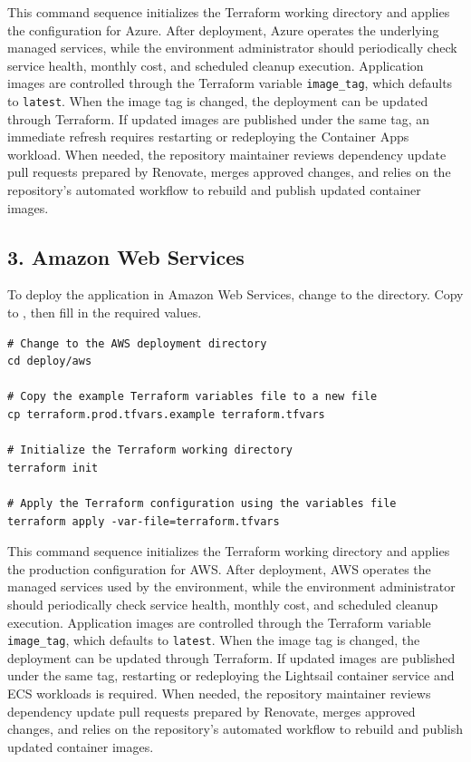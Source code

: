 This command sequence initializes the Terraform working directory and applies the configuration for Azure.
After deployment, Azure operates the underlying managed services, while the environment administrator should periodically check service health, monthly cost, and scheduled cleanup execution.
Application images are controlled through the Terraform variable \texttt{image\_tag}, which defaults to \texttt{latest}.
When the image tag is changed, the deployment can be updated through Terraform.
If updated images are published under the same tag, an immediate refresh requires restarting or redeploying the Container Apps workload.
When needed, the repository maintainer reviews dependency update pull requests prepared by Renovate, merges approved changes, and relies on the repository's automated workflow to rebuild and publish updated container images.

\subsection*{3. Amazon Web Services}
To deploy the application in Amazon Web Services, change to the  directory.
Copy  to , then fill in the required values.

\begin{verbatim}
# Change to the AWS deployment directory
cd deploy/aws

# Copy the example Terraform variables file to a new file
cp terraform.prod.tfvars.example terraform.tfvars

# Initialize the Terraform working directory
terraform init

# Apply the Terraform configuration using the variables file
terraform apply -var-file=terraform.tfvars
\end{verbatim}

This command sequence initializes the Terraform working directory and applies the production configuration for AWS\@.
After deployment, AWS operates the managed services used by the environment, while the environment administrator should periodically check service health, monthly cost, and scheduled cleanup execution.
Application images are controlled through the Terraform variable \texttt{image\_tag}, which defaults to \texttt{latest}.
When the image tag is changed, the deployment can be updated through Terraform.
If updated images are published under the same tag, restarting or redeploying the Lightsail container service and ECS workloads is required.
When needed, the repository maintainer reviews dependency update pull requests prepared by Renovate, merges approved changes, and relies on the repository's automated workflow to rebuild and publish updated container images.

